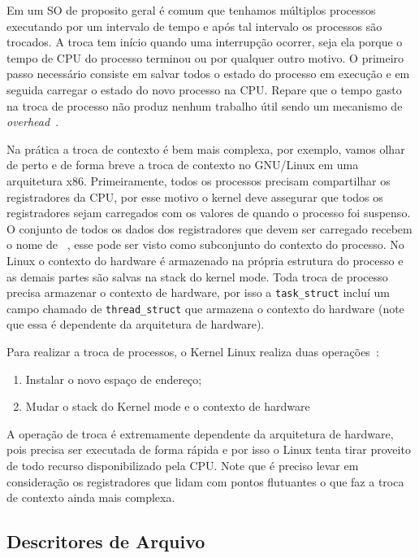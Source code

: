 Em um SO de proposito geral é comum que tenhamos múltiplos processos executando
por um intervalo de tempo e após tal intervalo os processos são trocados. A
troca tem início quando uma interrupção ocorrer, seja ela porque o tempo de CPU
do processo terminou ou por qualquer outro motivo. O primeiro passo necessário
consiste em salvar todos o estado do processo em execução e em seguida carregar
o estado do novo processo na CPU. Repare que o tempo gasto na troca de processo
não produz nenhum trabalho útil sendo um mecanismo de
\textit{overhead}~\citep{silberschatz}.

Na prática a troca de contexto é bem mais complexa, por exemplo, vamos olhar de
perto e de forma breve a troca de contexto no GNU/Linux em uma arquitetura x86.
Primeiramente, todos os processos precisam compartilhar os registradores da
CPU, por esse motivo o kernel deve assegurar que todos os registradores sejam
carregados com os valores de quando o processo foi suspenso. O conjunto de
todos os dados dos registradores que devem ser carregado recebem o nome de
~\citep{entendendo_kernel}, esse pode ser
visto como subconjunto do contexto do processo. No Linux o contexto do hardware
é armazenado na própria estrutura do processo e as demais partes são salvas na
stack do kernel mode. Toda troca de processo precisa armazenar o contexto de
hardware, por isso a \texttt{task\_struct} incluí um campo chamado de
\texttt{thread\_struct} que armazena o contexto do hardware (note que essa é
dependente da arquitetura de hardware).

Para realizar a troca de processos, o Kernel Linux realiza duas
operações~\citep{entendendo_kernel}:

\begin{enumerate}
  \item Instalar o novo espaço de endereço;
  \item Mudar o stack do Kernel mode e o contexto de hardware
\end{enumerate}

A operação de troca é extremamente dependente da arquitetura de hardware, pois
precisa ser executada de forma rápida e por isso o Linux tenta tirar proveito
de todo recurso disponibilizado pela CPU. Note que é preciso levar em
consideração os registradores que lidam com pontos flutuantes o que faz a troca
de contexto ainda mais complexa.

\subsection{Descritores de Arquivo}

